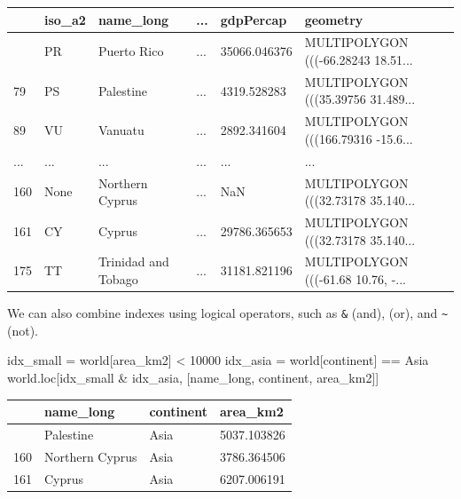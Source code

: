 \documentclass[
  letterpaper,
]{krantz}
\newenvironment{Shaded}{\begin{snugshade}}{\end{snugshade}}
\newcommand{\DecValTok}[1]{\textcolor[rgb]{0.68,0.00,0.00}{#1}}
\newcommand{\NormalTok}[1]{\textcolor[rgb]{0.00,0.23,0.31}{#1}}
\newcommand{\OperatorTok}[1]{\textcolor[rgb]{0.37,0.37,0.37}{#1}}
\newcommand{\StringTok}[1]{\textcolor[rgb]{0.13,0.47,0.30}{#1}}
\begin{document}
\begin{longtable}[]{@{}llllll@{}}
\toprule\noalign{}
& iso\_a2 & name\_long & ... & gdpPercap & geometry \\
\midrule\noalign{}
\endhead
\bottomrule\noalign{}
\endlastfoot
45 & PR & Puerto Rico & ... & 35066.046376 & MULTIPOLYGON (((-66.28243
18.51... \\
79 & PS & Palestine & ... & 4319.528283 & MULTIPOLYGON (((35.39756
31.489... \\
89 & VU & Vanuatu & ... & 2892.341604 & MULTIPOLYGON (((166.79316
-15.6... \\
... & ... & ... & ... & ... & ... \\
160 & None & Northern Cyprus & ... & NaN & MULTIPOLYGON (((32.73178
35.140... \\
161 & CY & Cyprus & ... & 29786.365653 & MULTIPOLYGON (((32.73178
35.140... \\
175 & TT & Trinidad and Tobago & ... & 31181.821196 & MULTIPOLYGON
(((-61.68 10.76, -... \\
\end{longtable}

We can also combine indexes using logical operators, such as \texttt{\&}
(and), \texttt{\textbar{}} (or), and \texttt{\textasciitilde{}} (not).

\begin{Shaded}
\begin{Highlighting}[]
\NormalTok{idx\_small }\OperatorTok{=}\NormalTok{ world[}\StringTok{\textquotesingle{}area\_km2\textquotesingle{}}\NormalTok{] }\OperatorTok{\textless{}} \DecValTok{10000}
\NormalTok{idx\_asia }\OperatorTok{=}\NormalTok{ world[}\StringTok{\textquotesingle{}continent\textquotesingle{}}\NormalTok{] }\OperatorTok{==} \StringTok{\textquotesingle{}Asia\textquotesingle{}}
\NormalTok{world.loc[idx\_small }\OperatorTok{\&}\NormalTok{ idx\_asia, [}\StringTok{\textquotesingle{}name\_long\textquotesingle{}}\NormalTok{, }\StringTok{\textquotesingle{}continent\textquotesingle{}}\NormalTok{, }\StringTok{\textquotesingle{}area\_km2\textquotesingle{}}\NormalTok{]]}
\end{Highlighting}
\end{Shaded}

\begin{longtable}[]{@{}llll@{}}
\toprule\noalign{}
& name\_long & continent & area\_km2 \\
\midrule\noalign{}
\endhead
\bottomrule\noalign{}
\endlastfoot
79 & Palestine & Asia & 5037.103826 \\
160 & Northern Cyprus & Asia & 3786.364506 \\
161 & Cyprus & Asia & 6207.006191 \\
\end{longtable}
\end{document}
